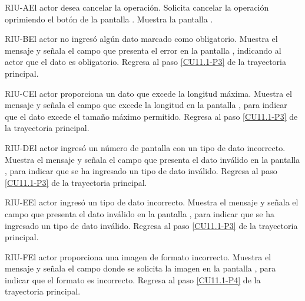 	\begin{UCtrayectoriaA}{RIU-A}{El actor desea cancelar la operación.}
		\UCpaso[\UCactor] Solicita cancelar la operación oprimiendo el botón  de la pantalla .
		\UCpaso[\UCsist] Muestra la pantalla .
	\end{UCtrayectoriaA}

	\begin{UCtrayectoriaA}{RIU-B}{El actor no ingresó algún dato marcado como obligatorio.}
		\UCpaso[\UCsist] Muestra el mensaje  y señala el campo que presenta el error en la pantalla , indicando al actor que el dato es obligatorio.
		\UCpaso Regresa al paso \ref{CU11.1-P3} de la trayectoria principal.
	\end{UCtrayectoriaA}

	\begin{UCtrayectoriaA}{RIU-C}{El actor proporciona un dato que excede la longitud máxima.}
		\UCpaso[\UCsist] Muestra el mensaje  y señala el campo que excede la longitud en la pantalla , para indicar que el dato excede el tamaño máximo permitido.
		\UCpaso Regresa al paso \ref{CU11.1-P3} de la trayectoria principal.
	\end{UCtrayectoriaA}

	\begin{UCtrayectoriaA}{RIU-D}{El actor ingresó un número de pantalla con un tipo de dato incorrecto.}
		\UCpaso[\UCsist] Muestra el mensaje  y señala el campo que presenta el dato inválido en la pantalla , para indicar que se ha ingresado un tipo de dato inválido.
		\UCpaso Regresa al paso \ref{CU11.1-P3} de la trayectoria principal.
	\end{UCtrayectoriaA}
	
	\begin{UCtrayectoriaA}{RIU-E}{El actor ingresó un tipo de dato incorrecto.}
		\UCpaso[\UCsist] Muestra el mensaje  y señala el campo que presenta el dato inválido en la pantalla , para indicar que se ha ingresado un tipo de dato inválido.
		\UCpaso Regresa al paso \ref{CU11.1-P3} de la trayectoria principal.
	\end{UCtrayectoriaA}

	\begin{UCtrayectoriaA}{RIU-F}{El actor proporciona una imagen de formato incorrecto.}
		\UCpaso[\UCsist] Muestra el mensaje  y señala el campo donde se solicita la imagen en la pantalla , para indicar que el formato es incorrecto.
		\UCpaso Regresa al paso \ref{CU11.1-P4} de la trayectoria principal.
	\end{UCtrayectoriaA}


